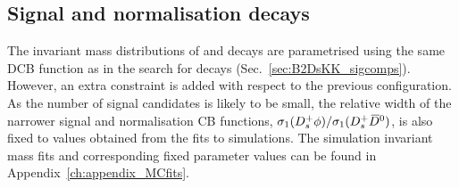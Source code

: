 \subsection{Signal and normalisation decays}
\label{sec:B2DsPhi_signalcomps}

The invariant mass distributions of \decay{\Bp}{\Dsp\phiz} and \decay{\Bp}{\Dsp\Dzb} decays are parametrised using the same DCB function as in the search for \decay{\Bp}{\Dsp\Kp\Km} decays (Sec.~\ref{sec:B2DsKK_sigcomps}).
However, an extra constraint is added with respect to the previous configuration. As the number of signal candidates is likely to be small, the relative width of the narrower signal and normalisation CB functions, $\sigma_{1}({{D}^+_{s}}\phi) / \sigma_{1}({{D}^+_{s}}{{\kern 0.2em\overline{\kern -0.2em D}{}}{}^0})$, is also fixed to values obtained from the fits to simulations. 
The simulation invariant mass fits and corresponding fixed parameter values can be found in Appendix~\ref{ch:appendix_MCfits}.


